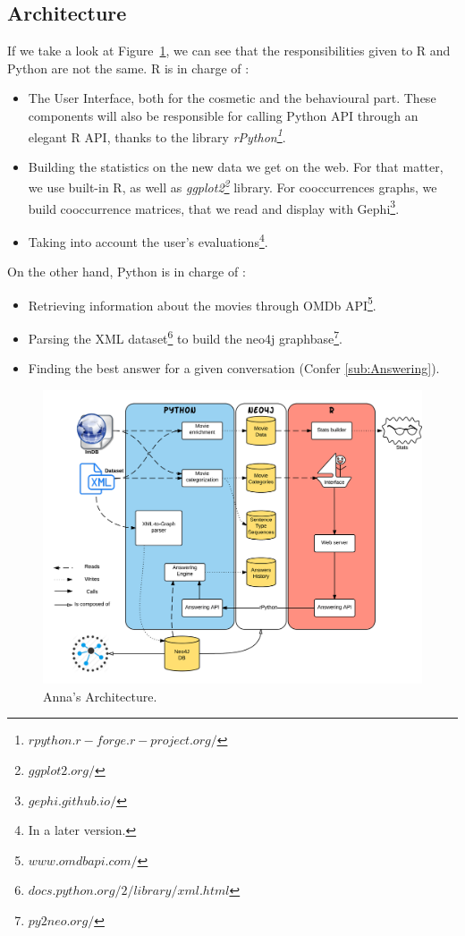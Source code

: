 \subsection{Architecture}
\label{sub:Architecture}

If we take a look at Figure~\ref{fig:Archi}, we can see that the responsibilities given to R and Python are not the same.
R is in charge of :
\begin{itemize}
    \item The User Interface, both for the cosmetic and the behavioural part.
    These components will also be responsible for calling Python API through an elegant R API, thanks to the library \textit{rPython\footnote{$rpython.r-forge.r-project.org/$}}.
    \item Building the statistics on the new data we get on the web.
    For that matter, we use built-in R, as well as \textit{ggplot2\footnote{$ggplot2.org/$}} library.
    For cooccurrences graphs, we build cooccurrence matrices, that we read and display with Gephi\footnote{$gephi.github.io/$}.
    \item Taking into account the user's evaluations\footnote{In a later version.}.
\end{itemize}

On the other hand, Python is in charge of :
\begin{itemize}
    \item Retrieving information about the movies through OMDb API\footnote{$www.omdbapi.com/$}.
    \item Parsing the XML dataset\footnote{$docs.python.org/2/library/xml.html$} to build the neo4j graphbase\footnote{$py2neo.org/$}.
    \item Finding the best answer for a given conversation (Confer \ref{sub:Answering}).
\end{itemize}

\begin{figure}[!h]
\begin{center}
\includegraphics[width=1.1\textwidth]{./img/Archi.png}
\end{center}
\caption{Anna's Architecture.}
\label{fig:Archi}
\end{figure}

